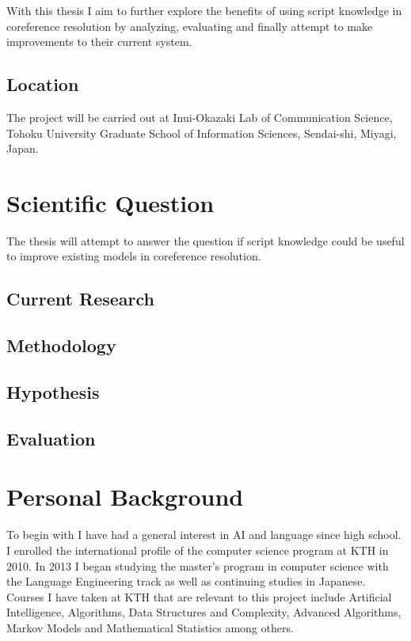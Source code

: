 \documentclass{article}
\begin{document}
With this thesis I aim to further explore the benefits of using script knowledge in coreference resolution by analyzing, evaluating and finally attempt to make improvements to their current system.
\subsection{Location}
The project will be carried out at Inui-Okazaki Lab of Communication Science, Tohoku University Graduate School of Information Sciences, Sendai-shi, Miyagi, Japan.
\section{Scientific Question}
The thesis will attempt to answer the question if script knowledge could be useful to improve existing models in coreference resolution.
\subsection{Current Research}

\subsection{Methodology}

\subsection{Hypothesis}

\subsection{Evaluation}

\section{Personal Background}
To begin with I have had a general interest in AI and language since high school. I enrolled the international profile of the computer science program at KTH in 2010. In 2013 I began studying the master's program in computer science with the Language Engineering track as well as continuing studies in Japanese. Courses I have taken at KTH that are relevant to this project include Artificial Intelligence, Algorithms, Data Structures and Complexity, Advanced Algorithms, Markov Models and Mathematical Statistics among others. 
\end{document}
